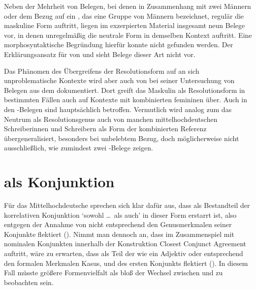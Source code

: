 Neben der Mehrheit von Belegen, bei denen in Zusammenhang mit zwei Männern oder
dem Bezug auf ein , das eine Gruppe von Männern bezeichnet,
regulär die maskuline Form  auftritt, liegen im exzerpierten
Material insgesamt neun Belege vor, in denen unregelmäßig die
neutrale Form  in demselben Kontext auftritt. Eine
morphosyntaktische Begründung hierfür konnte nicht gefunden werden. Der
Erklärungsansatz für  von \citet{wechslerzlatic2003} und
\citet{wechsler2009} sieht Belege dieser Art nicht vor.

Das Phänomen des Übergreifens der Resolutionsform auf an sich unproblematische
Kontexte wird aber auch von \citet[302]{corbett1991} bei seiner Untersuchung
von Belegen aus dem  dokumentiert. Dort greift das Maskulin als
Resolutionsform in bestimmten Fällen auch auf Kon\-texte mit kombinierten
femininen  über. Auch in den \CAO{}-Belegen sind hauptsächlich
 betroffen. Vermutlich wird analog zum  das Neutrum
als Resolutionsgenus auch von manchen
mittelhochdeutschen Schreiberinnen und Schreibern als
Form der kombinierten Referenz übergeneralisiert, besonders
bei unbelebtem Bezug, doch möglicherweise nicht ausschließlich,
wie zumindest zwei \KC-Belege zeigen.


\section{ als Konjunktion}
\label{sec:beideconj}

Für das Mittelhochdeutsche sprechen sich
\citet[626--627]{ksw2} klar dafür aus, dass  als Bestandteil der
korrelativen Konjunktion  `sowohl \dots\ als auch' in
dieser Form erstarrt ist, also  entgegen der Annahme von
\citet{askedal1974} nicht entsprechend den Genusmerkmalen
seiner Konjunkte flektiert (). Nimmt man dennoch an,
dass im Zusammenspiel mit nominalen Konjunkten innerhalb der Konstruktion
Closest Conjunct Agreement auftritt, wäre zu
erwarten, dass  als Teil der  wie ein
Adjektiv oder  entsprechend den formalen
Merkmalen Kasus,  und  des
ersten Konjunkts flektiert (). In diesem Fall müsste
größere Formenvielfalt als bloß der Wechsel zwischen  und
 zu beobachten sein.

